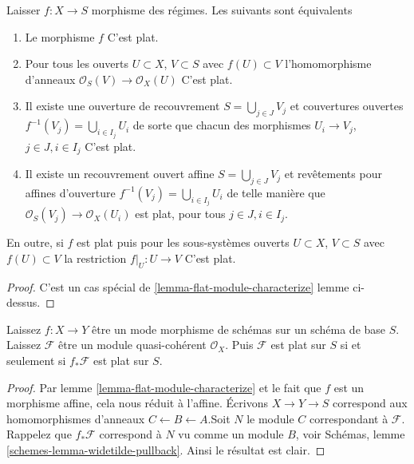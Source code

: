 \begin{lemma}

\label{lemma-flat-characterize}

Laisser $f : X \to S$ morphisme des régimes. Les suivants sont équivalents

\begin{enumerate}

\item Le morphisme $f$ C'est plat.
\item Pour tous les ouverts $U \subset X$, $V \subset S$
avec $f(U) \subset V$ l'homomorphisme d'anneaux
$\mathcal{O}_S(V) \to \mathcal{O}_X(U)$ C'est plat.
\item Il existe une ouverture de recouvrement $S = \bigcup_{j \in J} V_j$
et couvertures ouvertes $f^{-1}(V_j) = \bigcup_{i \in I_j} U_i$ de sorte que chacun des morphismes $U_i \to V_j$, $j\in J, i\in I_j$
C'est plat.
\item Il existe un recouvrement ouvert affine $S = \bigcup_{j \in J} V_j$
et revêtements pour affines d'ouverture $f^{-1}(V_j) = \bigcup_{i \in I_j} U_i$ de telle manière que $\mathcal{O}_S(V_j) \to \mathcal{O}_X(U_i)$ est plat, pour tous
$j\in J, i\in I_j$.

\end{enumerate}

En outre, si $f$ est plat puis pour les sous-systèmes ouverts $U \subset X$, $V \subset S$ avec $f(U) \subset V$
la restriction $f|_U : U \to V$ C'est plat.

\end{lemma}

\begin{proof}
C'est un cas spécial de \ref{lemma-flat-module-characterize} lemme ci-dessus.
\end{proof}

\begin{lemma}

\label{lemma-pushforward-flat-affine}
Laissez $f : X \to Y$ être un mode morphisme de schémas sur un schéma de base $S$. Laissez $\mathcal{F}$ être un module quasi-cohérent $\mathcal{O}_X$. Puis $\mathcal{F}$ est plat sur $S$ si et seulement si $f_*\mathcal{F}$ est plat sur $S$.
\end{lemma}

\begin{proof}
Par lemme \ref{lemma-flat-module-characterize} et le fait que $f$ est un morphisme affine, cela nous réduit à l'affine. Écrivons $X \to Y \to S$ correspond aux homomorphismes d'anneaux $C \leftarrow B \leftarrow A$.Soit $N$ le module $C$ correspondant à $\mathcal{F}$. Rappelez que $f_*\mathcal{F}$ correspond à $N$ vu comme un module $B$, voir Schémas, lemme \ref{schemes-lemma-widetilde-pullback}. Ainsi le résultat est clair.
\end{proof}

